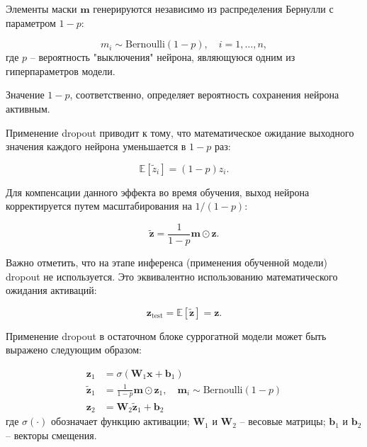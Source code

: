 Элементы маски $\mathbf{m}$ генерируются независимо из распределения Бернулли с параметром $1-p$:

\begin{equation*}
    m_i \sim \text{Bernoulli}(1-p), \quad i = 1, \ldots, n,
\end{equation*}
где $p$ -- вероятность "выключения" нейрона, являющуюся одним из гиперпараметров модели.

Значение $1-p$, соответственно, определяет вероятность сохранения нейрона активным.

Применение dropout приводит к тому, что математическое
ожидание выходного значения каждого нейрона уменьшается в $1-p$ раз:

\begin{equation*}
    \mathbb{E}[\tilde{z}_i] = (1-p)z_i.
\end{equation*}

Для компенсации данного эффекта во время обучения, выход нейрона
корректируется путем масштабирования на $1/(1-p)$:

\begin{equation}
    \tilde{\mathbf{z}} = \frac{1}{1-p}\mathbf{m} \odot \mathbf{z}.
\end{equation}

Важно отметить, что на этапе инференса (применения обученной модели)
dropout не используется. Это эквивалентно использованию математического ожидания активаций:

\begin{equation}
    \mathbf{z}_{\text{test}} = \mathbb{E}[\tilde{\mathbf{z}}] = \mathbf{z}.
\end{equation}

Применение dropout в остаточном блоке суррогатной модели может быть выражено следующим образом:

\begin{equation*}
    \begin{split}
        \mathbf{z}_1         & = \sigma(\mathbf{W}_1\mathbf{x} + \mathbf{b}_1)                                             \\
        \tilde{\mathbf{z}}_1 & = \frac{1}{1-p}\mathbf{m} \odot \mathbf{z}_1, \quad \mathbf{m}_i \sim \text{Bernoulli}(1-p) \\
        \mathbf{z}_2         & = \mathbf{W}_2\tilde{\mathbf{z}}_1 + \mathbf{b}_2
    \end{split}
\end{equation*}
где $\sigma(\cdot)$ обозначает функцию активации;
$\mathbf{W}_1$ и $\mathbf{W}_2$ -- весовые матрицы;
$\mathbf{b}_1$ и $\mathbf{b}_2$ -- векторы смещения.

